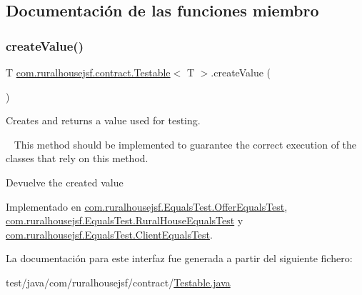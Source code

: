 \subsection{Documentación de las funciones miembro}
\mbox{\label{a00244_ae4546a381488faaba1ef7c0f8688de9c}} 
\subsubsection{\texorpdfstring{createValue()}{createValue()}}
{\footnotesize\ttfamily T \mbox{\hyperlink{a00244}{com.\+ruralhousejsf.\+contract.\+Testable}}$<$ T $>$.create\+Value (\begin{DoxyParamCaption}{ }\end{DoxyParamCaption})}



Creates and returns a value used for testing. 

~\newline
 This method should be implemented to guarantee the correct execution of the classes that rely on this method.

\begin{DoxyReturn}{Devuelve}
the created value 
\end{DoxyReturn}


Implementado en \mbox{\hyperlink{a00260_a25524d0ab8278899774751c0f7630e8d}{com.\+ruralhousejsf.\+Equals\+Test.\+Offer\+Equals\+Test}}, \mbox{\hyperlink{a00256_abcab55b3e63c8d5511f04e395ff0f111}{com.\+ruralhousejsf.\+Equals\+Test.\+Rural\+House\+Equals\+Test}} y \mbox{\hyperlink{a00252_aa74f54ea042862db1a5499d31ec75539}{com.\+ruralhousejsf.\+Equals\+Test.\+Client\+Equals\+Test}}.



La documentación para este interfaz fue generada a partir del siguiente fichero\+:\begin{DoxyCompactItemize}
\item 
test/java/com/ruralhousejsf/contract/\mbox{\hyperlink{a00089}{Testable.\+java}}\end{DoxyCompactItemize}
